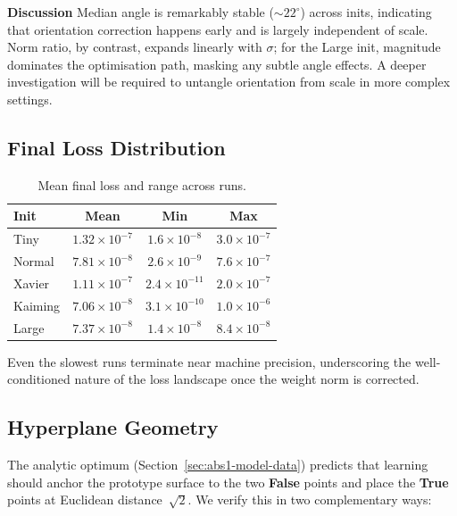 \textbf{Discussion}  
Median angle is remarkably stable ($\sim22^\circ$) across inits, indicating
that orientation correction happens early and is largely independent of scale.
Norm ratio, by contrast, expands linearly with $\sigma$; for the Large init,
magnitude dominates the optimisation path, masking any subtle angle effects.
A deeper investigation will be required to untangle orientation from scale in
more complex settings.

\subsection*{Final Loss Distribution}

\begin{table}[h]
\centering
\caption{Mean final loss and range across runs.}
\label{tab:abs1-init-loss}
\begin{tabular}{lccc}
\toprule
Init & Mean & Min & Max \\
\midrule
Tiny    & $1.32\times10^{-7}$ & $1.6\times10^{-8}$ & $3.0\times10^{-7}$ \\
Normal  & $7.81\times10^{-8}$ & $2.6\times10^{-9}$ & $7.6\times10^{-7}$ \\
Xavier  & $1.11\times10^{-7}$ & $2.4\times10^{-11}$ & $2.0\times10^{-7}$ \\
Kaiming & $7.06\times10^{-8}$ & $3.1\times10^{-10}$ & $1.0\times10^{-6}$ \\
Large   & $7.37\times10^{-8}$ & $1.4\times10^{-8}$ & $8.4\times10^{-8}$ \\
\bottomrule
\end{tabular}
\end{table}

Even the slowest runs terminate near machine precision, underscoring the
well-conditioned nature of the loss landscape once the weight norm is
corrected.

\subsection*{Hyperplane Geometry}
\label{sec:init-geometry}

The analytic optimum (Section~\ref{sec:abs1-model-data}) predicts that learning
should anchor the prototype surface to the two \textbf{False} points
and place the \textbf{True} points at Euclidean distance~$\sqrt2$.
We verify this in two complementary ways:

